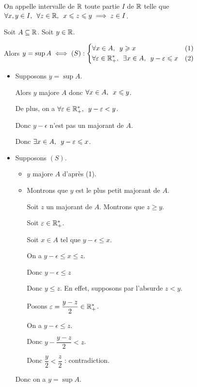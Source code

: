 \begin{rappel}
On appelle intervalle de \(\mathbb{R}\) toute partie \(I\) de \(\mathbb{R}\) telle que \(\quantifs{\forall x,y\in I;\forall z\in\R}x\leq z\leq y\imp z\in I\).
\end{rappel}

\begin{theo}
Soit \(A\subseteq\mathbb{R}\). Soit \(y\in\mathbb{R}\).

Alors \(y=\sup A\iff(S):\begin{dcases}\quantifs{\forall x\in A}y\geq x &(1) \\ \quantifs{\forall\epsilon\in\Rps;\exists x\in A}y-\epsilon\leq x &(2)\end{dcases}\)
\end{theo}

\begin{dem}
\begin{itemize}
\item[\impdir] Supposons \(y=\sup A\).

Alors \(y\) majore \(A\) donc \(\quantifs{\forall x\in A}x\leq y\).

De plus, on a \(\quantifs{\forall\epsilon\in\Rps}y-\epsilon<y\).

Donc \(y-\epsilon\) n'est pas un majorant de \(A\).

Donc \(\quantifs{\exists x\in A}y-\epsilon\leq x\).

\item[\imprec] Supposons \((S)\).

\begin{itemize}
\item \(y\) majore \(A\) d'après (1).

\item Montrons que \(y\) est le plus petit majorant de \(A\).

Soit \(z\) un majorant de \(A\). Montrons que \(z\geq y\).

Soit \(\varepsilon\in\mathbb{R}_+^*\).

Soit \(x\in A\) tel que \(y-\epsilon\leq x\).

On a \(y-\epsilon\leq x\leq z\).

Donc \(y-\epsilon\leq z\)

Donc \(y\leq z\). En effet, supposons par l'absurde \(z<y\).

Posons \(\varepsilon=\dfrac{y-z}{2}\in\mathbb{R}_+^*\).

On a \(y-\epsilon\leq z\).

Donc \(y-\dfrac{y-z}{2}<z\).

Donc \(\dfrac{y}{2}<\dfrac{z}{2}\) : contradiction.
\end{itemize}

Donc on a \(y=\sup A\).
\end{itemize}
\end{dem}

